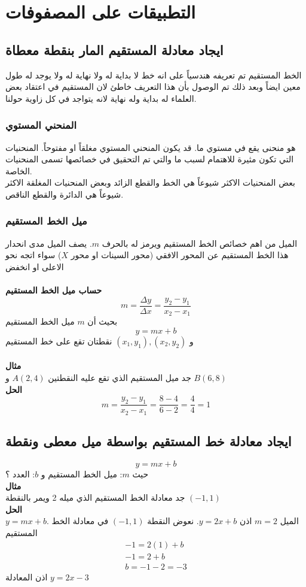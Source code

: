 \chapter{التطبيقات على المصفوفات}
\section{ايجاد معادلة المستقيم المار بنقطة معطاة}
الخط المستقيم تم تعريفه هندسياً على انه خط لا بداية له ولا نهاية له ولا يوجد له طول معين ايضاً وبعد ذلك تم الوصول بأن هذا التعريف خاطئ لان المستقيم في اعتقاد بعض العلماء له بداية وله نهاية لانه يتواجد في كل زاوية حولنا.

\subsection*{المنحني المستوي}
هو منحنى يقع في مستوي ما. قد يكون المنحني المستوي مغلقاً او مفتوحاً. المنحنيات التي تكون مثيرة للاهتمام لسبب ما والتي تم التحقيق في خصائصها تسمى المنحنيات الخاصة.\\
بعض المنحنيات الاكثر شيوعاً هي الخط والقطع الزائد وبعض المنحنيات المغلقة الاكثر شيوعاً هي الدائرة والقطع الناقص.

\subsection*{ميل الخط المستقيم} 
الميل من اهم خصائص الخط المستقيم ويرمز له بالحرف $m$. يصف الميل مدى انحدار
هذا الخط المستقيم عن المحور الافقي (محور السينات او محور $X$) سواء اتجه نحو الاعلى  او انخفض\\\\
\textbf{حساب ميل الخط المستقيم}
\[
m = \frac{\Delta y}{\Delta x} = \frac{y_2 - y_1}{x_2 - x_1}
\]
بحيث أن $m$ ميل الخط المستقيم 
\[
y = mx + b
\]
و $(x_1, y_1), (x_2, y_2)$ نقطتان تقع على خط المستقيم\\\\

\noindent
\textbf{مثال}\\
\noindent
جد ميل المستقيم الذي تقع عليه النقطتين $A(2,4)$ و $B(6,8)$\\
\noindent
\textbf{الحل}
\[
m = \frac{y_2 - y_1}{x_2 - x_1} = \frac{8-4 }{6-2} = \frac{4}{4} = 1
\]
\newpage
\section{ايجاد معادلة خط المستقيم بواسطة ميل معطى ونقطة}
\[
y = mx + b
\]
حيث $m$: ميل الخط المستقيم و $b$: العدد ؟\\ [10pt]
\noindent
\textbf{مثال}\\
\noindent
جد معادلة الخط المستقيم الذي ميله 2 ويمر بالنقطة 
$(-1,1)$\\
\noindent
\textbf{الحل}\\
\noindent
$y = mx + b$. الميل $m=2$ اذن $y = 2x + b$. نعوض النقطة $(-1,1)$ في معادلة الخط المستقيم
\begin{gather*}
	-1 = 2(1) + b\\
	-1 = 2+b\\
	b = -1-2 = -3
\end{gather*}
اذن المعادلة $y=2x-3$\\ [10pt]

